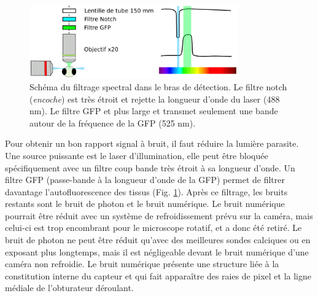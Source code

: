 \begin{figure}
    \centering
    \includegraphics[width=0.8\textwidth]{./files/detection_unit.svg.png}
    \caption{Schéma du filtrage spectral dans le bras de détection. Le filtre notch (\emph{encoche}) est très étroit et rejette la longueur d'onde du laser (488 nm). Le filtre GFP et plus large et transmet seulement une bande autour de la fréquence de la GFP (525 nm).
    \label{FIGspectralfiltering}}
    \end{figure}


Pour obtenir un bon rapport signal à bruit, il faut réduire la lumière parasite. Une source puissante est le laser d'illumination, elle peut être bloquée spécifiquement avec un filtre coup bande très étroit à sa longueur d'onde. Un filtre GFP (passe-bande à la longueur d'onde de la GFP) permet de filtrer davantage l'autofluorescence des tissus (Fig. \ref{FIGspectralfiltering}). Après ce filtrage, les bruits restants sont le bruit de photon et le bruit numérique. Le bruit numérique pourrait être réduit avec un système de refroidissement prévu sur la caméra, mais celui-ci est trop encombrant pour le microscope rotatif, et a donc été retiré. Le bruit de photon ne peut être réduit qu'avec des meilleures sondes calciques ou en exposant plus longtemps, mais il est négligeable devant le bruit numérique d'une caméra non refroidie. Le bruit numérique présente une structure liée à la constitution interne du capteur et qui fait apparaître des raies de pixel et la ligne médiale de l'obturateur déroulant.


